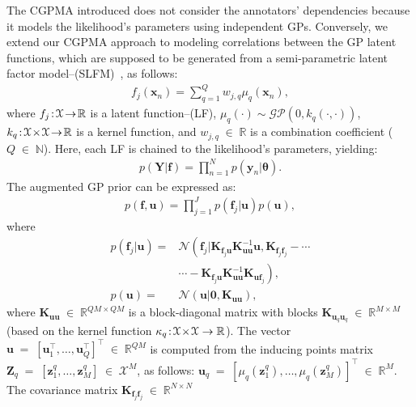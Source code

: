\documentclass[journal]{IEEEtran}
\providecommand{\ve}[1]{{\bm{#1}}}%
\providecommand{\mat}[1]{{\bm{#1}}} %
\newcommand{\Real}{\mathbb{R}}
\DeclareMathOperator{\en}{\!\,\in\!\,}
\DeclareMathOperator{\igual}{\!\,=\!\,}
\providecommand{\s}[1]{\negthinspace#1\negthinspace}%
\providecommand{\ve}[1]{{\mathbf{#1}}}
\providecommand{\mat}[1]{{\mathbf{#1}}}
\newcommand{\gauss}{\mathcal{N}} %
\begin{document}
The CGPMA introduced does not consider the annotators' dependencies because it models the likelihood's parameters using independent GPs. Conversely, we extend our CGPMA approach to modeling correlations between the GP latent functions, which are supposed to be generated from a semi-parametric latent factor model--(SLFM)~\cite{teh2005semiparametric}, as follows:
\begin{align}
\label{eq:SLFM}
f_j(\ve{x}_n) = \sum_{q=1}^{Q} w_{j,q} \mu_{q}(\ve{x}_n),
\end{align}
where $f_j\s{:}\mathcal{X}\s{\to}\Real$ is a latent function--(LF), $\mu_q(\cdot) \sim \mathcal{GP}(0,{k}_q(\cdot, \cdot))$, ${k}_q\s{:}\mathcal{X}\s{\times}\mathcal{X}\s{\to}\Real$ is a kernel function, and $w_{j,q}\en\Real$ is a combination coefficient ($Q\en\mathbb{N}$). Here, each LF is chained to the likelihood's parameters, yielding:
\begin{align}
p(\mat{Y}|{\ve{f}}) = \prod_{n=1}^{N}p(\ve{y}_n|\bm{\theta}).
\end{align} 
The augmented GP prior can be expressed as:
\begin{align}
\label{eq:CCGPpri}
p({\ve{f}}, {\ve{u}}) = \prod_{j=1}^{J}p(\ve{f}_j|{\ve{u}})p({\ve{u}}),
\end{align}
where
\begin{align}
p(\ve{f}_j|{\ve{u}})=& \gauss\left(\ve{f}_j|\mat{K}_{\ve{f}_j{\ve{u}}}\mat{K}^{-1}_{{\ve{u}}{\ve{u}}}{\ve{u}},\mat{K}_{\ve{f}_j\ve{f}_j}\right.-\cdots \nonumber\\
&\cdots-\left.\mat{K}_{\ve{f}_j{\ve{u}}}\mat{K}^{-1}_{{\ve{u}}{\ve{u}}}\mat{K}_{{\ve{u}}\ve{f}_j}\right),\\
p({\ve{u}}) =& \gauss\left({\ve{u}}| \ve{0}, \mat{K}_{{\ve{u}}{\ve{u}}}\right),
\end{align}
where $\mat{K}_{{\ve{u}}{\ve{u}}} \en \Real^{QM\times QM}$ is a block-diagonal matrix with blocks $\mat{K}_{\ve{u}_q\ve{u}_q}\en \Real^{M\times M}$ (based on the kernel function ${\kappa}_q\s{:}\mathcal{X}\s{\times}\mathcal{X}\to \Real$). The vector ${\ve{u}} \igual \left[\ve{u}_1^{\top}, \dots , \ve{u}_Q^{\top} \right]^{\top} \en \Real^{QM}$ is computed from the inducing points matrix $\mat{Z}_q\igual\left[\ve{z}_1^q, \dots , \ve{z}_M^q\right]\en\mathcal{X}^{M}$, as follows: $\ve{u}_q\igual \left[\mu_q(\ve{z}_1^q), \dots , \mu_q(\ve{z}_M^q)\right]^{\top}\en\Real^{M}$.
The covariance matrix $\mat{K}_{\ve{f}_j\ve{f}_j}\en \Real^{N\times N}$ 
\end{document}
